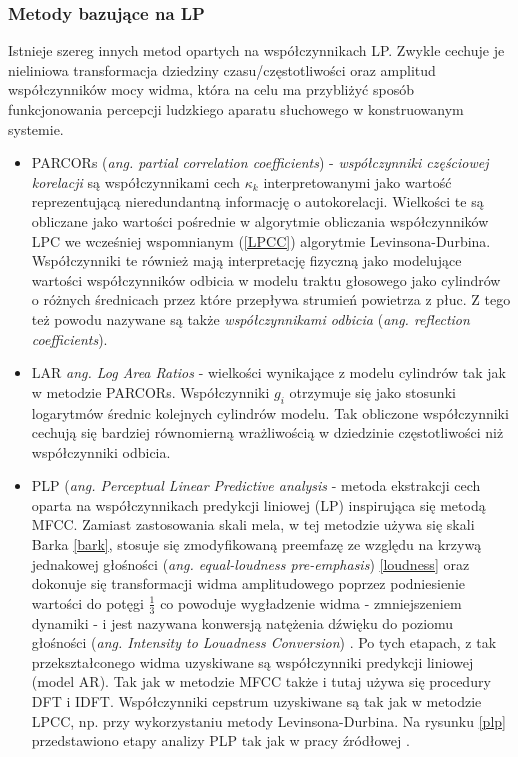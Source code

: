 \subsubsection{Metody bazujące na LP}
Istnieje szereg innych metod opartych na współczynnikach LP. Zwykle cechuje je nieliniowa transformacja dziedziny czasu/częstotliwości oraz amplitud współczynników mocy widma, która na celu ma przybliżyć sposób funkcjonowania percepcji ludzkiego aparatu słuchowego w konstruowanym systemie. 
\begin{itemize}
  \item{PARCORs (\textit{ang. partial correlation coefficients})} - \textit{współczynniki częściowej korelacji} są współczynnikami cech $\kappa_k$ interpretowanymi jako wartość reprezentującą nieredundantną informację o autokorelacji\cite{fosr}. Wielkości te są obliczane jako wartości pośrednie w algorytmie obliczania współczynników LPC we wcześniej wspomnianym (\ref{LPCC}) algorytmie Levinsona-Durbina. Współczynniki te również mają interpretację fizyczną jako modelujące wartości współczynników odbicia w modelu traktu głosowego jako cylindrów o różnych średnicach przez które przepływa strumień powietrza z płuc\cite{flanganfosr21}. Z tego też powodu nazywane są także \textit{współczynnikami odbicia} (\textit{ang. reflection coefficients}).

  \item{LAR \textit{ang. Log Area Ratios}} - wielkości wynikające z modelu cylindrów tak jak w metodzie PARCORs. Współczynniki $ g_i $ otrzymuje się jako stosunki logarytmów średnic kolejnych cylindrów modelu. Tak obliczone współczynniki cechują się bardziej równomierną wrażliwością w dziedzinie częstotliwości niż współczynniki odbicia\cite{campbell}.

  \item{PLP (\textit{ang. Perceptual Linear Predictive analysis}\label{plp}} - metoda ekstrakcji cech oparta na współczynnikach predykcji liniowej (LP) inspirująca się metodą MFCC. Zamiast zastosowania skali mela, w tej metodzie używa się skali Barka \ref{bark}, stosuje się zmodyfikowaną preemfazę ze względu na krzywą jednakowej głośności (\textit{ang. equal-loudness pre-emphasis}) \ref{loudness} oraz dokonuje się transformacji widma amplitudowego poprzez podniesienie wartości do potęgi $\frac{1}{3}$ co powoduje wygładzenie widma - zmniejszeniem dynamiki - i jest nazywana konwersją natężenia dźwięku do poziomu głośności (\textit{ang. Intensity to Louadness Conversion}) \cite{hoening}. Po tych etapach, z tak przekształconego widma uzyskiwane są współczynniki predykcji liniowej (model AR). Tak jak w metodzie MFCC także i tutaj używa się procedury DFT i IDFT. Współczynniki cepstrum uzyskiwane są tak jak w metodzie LPCC, np. przy wykorzystaniu metody Levinsona-Durbina. Na rysunku \ref{plp} przedstawiono etapy analizy PLP tak jak w pracy źródłowej \cite{fosr30hermansky}.


\end{itemize}
